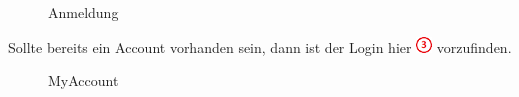 \documentclass[11pt,ngerman]{article}
\begin{document}
    \begin{figure}[H]
    	\centering
    	\caption{Anmeldung}
    	\label{fig:Anmeldung}
    \end{figure}
    
    Sollte bereits ein Account vorhanden sein, dann ist der Login hier \includegraphics{figures/3.png} vorzufinden.
       
    \begin{figure}[H]
    	\centering
    	\caption{MyAccount}
    	\label{fig:MyAccount}
    \end{figure}
\end{document}

